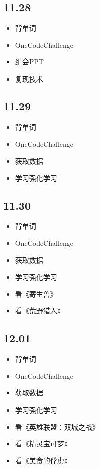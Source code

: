 \documentclass[UTF8]{ctexart}
\begin{document}
\subsection*{11.28}
\begin{itemize}
    \item 背单词
    \item OneCodeChallenge
    \item 组会PPT
    \item 复现技术
\end{itemize}

\subsection*{11.29}
\begin{itemize}
    \item 背单词
    \item OneCodeChallenge
    \item 获取数据
    \item 学习强化学习
\end{itemize}

\subsection*{11.30}
\begin{itemize}
    \item 背单词
    \item OneCodeChallenge
    \item 获取数据
    \item 学习强化学习
    \item 看《寄生兽》
    \item 看《荒野猎人》
\end{itemize}

\subsection*{12.01}
\begin{itemize}
    \item 背单词
    \item OneCodeChallenge
    \item 获取数据
    \item 学习强化学习
    \item 看《英雄联盟：双城之战》
    \item 看《精灵宝可梦》
    \item 看《美食的俘虏》
\end{itemize}
\end{document}
